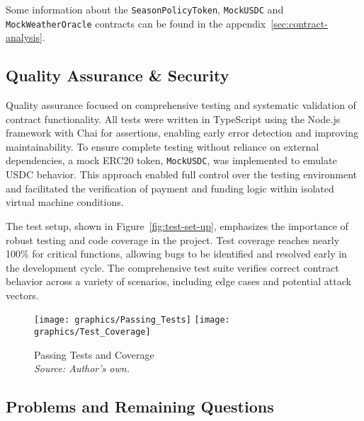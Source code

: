 \documentclass[11pt,a4paper]{article}
\begin{document}
		Some information about the \texttt{SeasonPolicyToken}, \texttt{MockUSDC} and \texttt{MockWeatherOracle} contracts can be found in the appendix~\ref{sec:contract-analysis}.

		\subsection{Quality Assurance \& Security}\label{subsec:qa-security}
		Quality assurance focused on comprehensive testing and systematic validation of contract functionality.
		All tests were written in TypeScript using the Node.js framework with Chai for assertions, enabling early error detection and improving maintainability.
		To ensure complete testing without reliance on external dependencies, a mock ERC20 token, \texttt{MockUSDC}, was implemented to emulate USDC behavior.
		This approach enabled full control over the testing environment and facilitated the verification of payment and funding logic within isolated virtual machine conditions.

		The test setup, shown in Figure~\ref{fig:test-set-up}, emphasizes the importance of robust testing and code coverage in the project.
		Test coverage reaches nearly 100\% for critical functions, allowing bugs to be identified and resolved early in the development cycle.
		The comprehensive test suite verifies correct contract behavior across a variety of scenarios, including edge cases and potential attack vectors.

        \begin{figure}[!htbp]
            \centering
            \begin{minipage}[b]{0.48\textwidth}
                \centering
                \texttt{[image: graphics/Passing\_Tests]}
                \texttt{[image: graphics/Test\_Coverage]}
                \caption{Passing Tests and Coverage \\ \textit{Source: Author's own.}}
                \label{fig:test-set-up}
            \end{minipage}\label{fig:figure}
        \end{figure}


        \FloatBarrier

    \subsection{Problems and Remaining Questions}\label{subsec:problems-and-remaining-questions}
\end{document}
